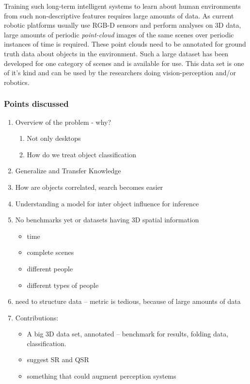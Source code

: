 \documentclass[letterpaper]{article}
\begin{document}
Training such long-term intelligent systems to learn about human environments from such non-descriptive features requires large amounts of data. As current robotic platforms usually use RGB-D sensors and perform analyses on 3D data, large amounts of periodic \textit{point-cloud} images of the same scenes over periodic instances of time is required. These point clouds need to be annotated for ground truth data about objects in the environment. Such a large dataset has been developed for one category of scenes and is available for use. This data set is one of it's kind and can be used by the researchers doing vision-perception and/or robotics.

\subsubsection*{Points discussed}
\begin{enumerate}
	\item Overview of the problem - why?
	\begin{enumerate}
		\item Not only desktops
		\item How do we treat object classification
	\end{enumerate}
	\item Generalize and Transfer Knowledge
	\item How are objects correlated, search becomes easier
	\item Understanding a model for inter object influence for inference
	\item No benchmarks yet or datasets having 3D spatial information
	\begin{itemize}
		\item time
		\item complete scenes
		\item different people
		\item different types of people
	\end{itemize}
	\item need to structure data -- metric is tedious, because of large amounts of data
	\item Contributions:
	\begin{itemize}
		\item A big 3D data set, annotated -- benchmark for results, folding data, classification.
		\item suggest SR and QSR
		\item something that could augment perception systems
	\end{itemize}
\end{enumerate}
\end{document}
